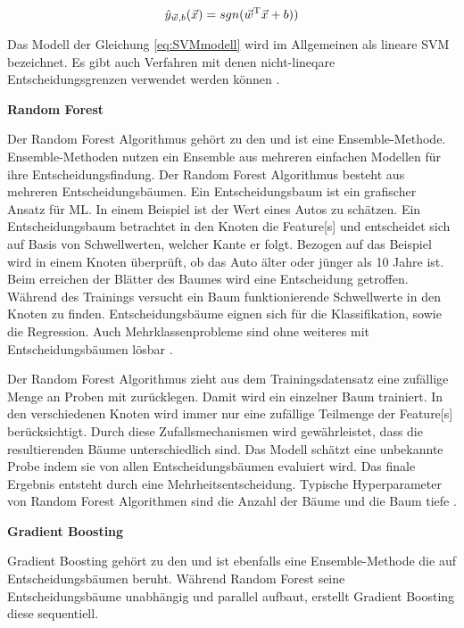\begin{equation}
\hat{y}_{\vec{w},b}(\vec{x}) = sgn(\vec{w}^\mathrm{T}\vec{x}+b))
\label{eq:SVMmodell}
\end{equation}

Das Modell der Gleichung \ref{eq:SVMmodell} wird im Allgemeinen als lineare \acrshort{SVM} bezeichnet. Es gibt auch Verfahren mit denen nicht-lineqare Entscheidungsgrenzen verwendet werden können \cite{Burkov.2019, Goodfellow.2016, ShalevShwartz.2014}. \dubpar

\textbf{Random Forest}\par
Der Random Forest Algorithmus gehört zu den  und ist eine Ensemble-Methode. Ensemble-Methoden nutzen ein Ensemble aus mehreren einfachen Modellen für ihre Entscheidungsfindung. Der Random Forest Algorithmus besteht aus mehreren Entscheidungsbäumen. Ein Entscheidungsbaum ist ein grafischer Ansatz für \gls{ML}. In einem Beispiel ist der Wert eines Autos zu schätzen. Ein Entscheidungsbaum betrachtet in den Knoten die \gls{Feature}[s] und entscheidet sich auf Basis von Schwellwerten, welcher Kante er folgt. Bezogen auf das Beispiel wird in einem Knoten überprüft, ob das Auto älter oder jünger als 10 Jahre ist. Beim erreichen der Blätter des Baumes wird eine Entscheidung getroffen. Während des Trainings versucht ein Baum funktionierende Schwellwerte in den Knoten zu finden. Entscheidungsbäume eignen sich für die \gls{Klassifikation}, sowie die Regression. Auch Mehrklassenprobleme sind ohne weiteres mit Entscheidungsbäumen lösbar \cite{Burkov.2019, Bishop.2006, Goodfellow.2016}. \par

Der Random Forest Algorithmus zieht aus dem \gls{Trainingsdatensatz} eine zufällige Menge an Proben mit zurücklegen. Damit wird ein einzelner Baum trainiert. In den verschiedenen Knoten wird immer nur eine zufällige Teilmenge der \gls{Feature}[s] berücksichtigt. Durch diese Zufallsmechanismen wird gewährleistet, dass die resultierenden Bäume unterschiedlich sind. Das Modell schätzt eine unbekannte Probe indem sie von allen Entscheidungsbäumen evaluiert wird. Das finale Ergebnis entsteht durch eine Mehrheitsentscheidung. Typische \gls{Hyperparameter} von  Random Forest Algorithmen sind die Anzahl der Bäume und die Baum tiefe \cite{Burkov.2019, Breiman.2001}. \dubpar

\textbf{Gradient Boosting} \par
Gradient Boosting gehört zu den  und ist ebenfalls eine Ensemble-Methode die auf Entscheidungsbäumen beruht. Während Random Forest seine Entscheidungsbäume unabhängig und parallel aufbaut, erstellt Gradient Boosting diese sequentiell. \par 

